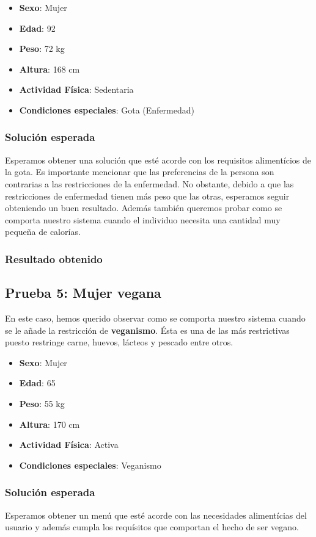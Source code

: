 \documentclass[11]{article}
\begin{document}
\begin{itemize}
\item \textbf{Sexo}: Mujer
\item \textbf{Edad}: 92
\item \textbf{Peso}: 72 kg 
\item \textbf{Altura}: 168 cm
\item \textbf{Actividad Física}: Sedentaria
\item \textbf{Condiciones especiales}: Gota (Enfermedad)
\end{itemize}

\subsubsection{Solución esperada}
Esperamos obtener una solución que esté acorde con los requisitos alimentícios de la gota. Es importante mencionar que las preferencias de la persona son contrarias a las restricciones de la enfermedad. No obstante, debido a que las restricciones de enfermedad tienen más peso que las otras, esperamos seguir obteniendo un buen resultado. Además también queremos probar como se comporta nuestro sistema cuando el individuo necesita una cantidad muy pequeña de calorías. 

\subsubsection{Resultado obtenido}


\subsection{Prueba 5: Mujer vegana}
En este caso, hemos querido observar como se comporta nuestro sistema cuando se le añade la restricción de \textbf{veganismo}. Ésta es una de las más restrictivas puesto restringe carne, huevos, lácteos y pescado entre otros. 

\begin{itemize}
\item \textbf{Sexo}: Mujer
\item \textbf{Edad}: 65
\item \textbf{Peso}: 55 kg
\item \textbf{Altura}: 170 cm
\item \textbf{Actividad Física}: Activa
\item \textbf{Condiciones especiales}: Veganismo
\end{itemize}

\subsubsection{Solución esperada}
Esperamos obtener un menú que esté acorde con las necesidades alimentícias del usuario y además cumpla los requísitos que comportan el hecho de ser vegano.
\end{document}

